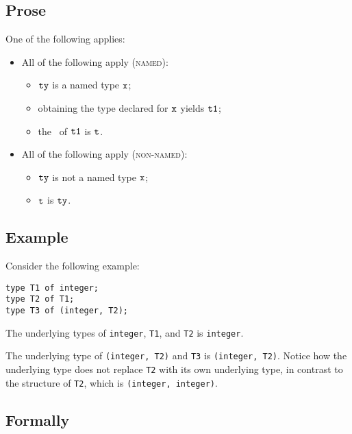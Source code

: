 \subsection{Prose}
One of the following applies:
\begin{itemize}
  \item All of the following apply (\textsc{named}):
  \begin{itemize}
    \item $\texttt{ty}$ is a named type $\texttt{x}$;
    \item obtaining the type declared for $\texttt{x}$ yields $\texttt{t1}$\ProseOrTypeError;
    \item the \underlyingtype\ of $\texttt{t1}$ is $\texttt{t}$.
  \end{itemize}

  \item All of the following apply (\textsc{non-named}):
  \begin{itemize}
    \item $\texttt{ty}$ is not a named type $\texttt{x}$;
    \item $\texttt{t}$ is $\texttt{ty}$.
  \end{itemize}
\end{itemize}

\subsection{Example}
Consider the following example:
\begin{verbatim}
type T1 of integer;
type T2 of T1;
type T3 of (integer, T2);
\end{verbatim}

The underlying types of \texttt{integer}, \texttt{T1}, and \texttt{T2} is \texttt{integer}.

The underlying type of \texttt{(integer, T2)} and \texttt{T3} is
\texttt{(integer, T2)}.  Notice how the underlying type does not replace
\texttt{T2} with its own underlying type, in contrast to the structure of
\texttt{T2}, which is \texttt{(integer, integer)}.


\subsection{Formally}

